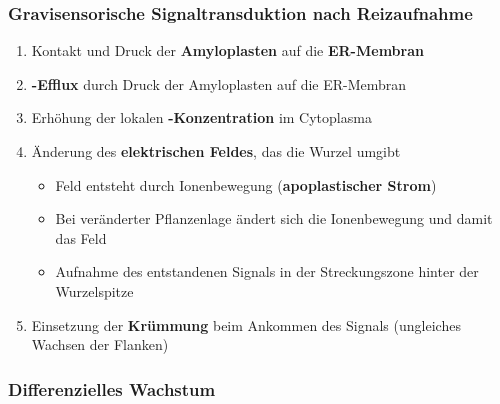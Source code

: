\documentclass[aspectratio=169
]{beamer}
\begin{document}
\begin{frame}[<+(1)->]
\frametitle{Gravisensorische Signaltransduktion nach Reizaufnahme}

\begin{enumerate}
	\item Kontakt und Druck der \textbf{Amyloplasten} auf die \textbf{ER-Membran}
	\item \textbf{-Efflux} durch Druck der Amyloplasten auf die ER-Membran 
	\item Erhöhung der lokalen \textbf{-Konzentration} im Cytoplasma
	\item Änderung des \textbf{elektrischen Feldes}, das die Wurzel umgibt
	\begin{itemize}
		\item Feld entsteht durch Ionenbewegung (\textbf{apoplastischer Strom})
		\item Bei veränderter Pflanzenlage ändert sich die Ionenbewegung und damit das Feld
		\item Aufnahme des entstandenen Signals in der Streckungszone hinter der Wurzelspitze
	\end{itemize}
	
	\item Einsetzung der \textbf{Krümmung} beim Ankommen des Signals (ungleiches Wachsen der Flanken)
\end{enumerate}
\end{frame}
			
\subsubsection{Differenzielles Wachstum}
\end{document}
